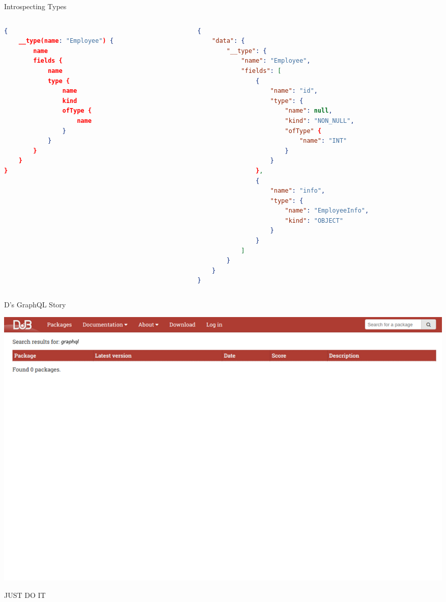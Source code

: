 \documentclass[aspectratio=169]{beamer}
\begin{document}
	\begin{frame}[fragile]{Introspecting Types}
		\vspace{-7mm}	
		\begin{columns}[t]
			\begin{column}{0.5\textwidth}
				\begin{lstlisting}[language=json,basicstyle=\scriptsize\ttfamily]
{
	__type(name: "Employee") {
		name
		fields {
			name
			type {
				name
				kind
				ofType {
					name
				}
			}
		}
	}
}
\end{lstlisting}	
			\end{column}
			\begin{column}{0.5\textwidth}
				\begin{lstlisting}[language=json,basicstyle=\scriptsize\ttfamily]
{
	"data": {
		"__type": {
			"name": "Employee",
			"fields": [
				{
					"name": "id",
					"type": {
						"name": null,
						"kind": "NON_NULL",
						"ofType" {
							"name": "INT"
						}
					}
				},
				{
					"name": "info",
					"type": {
						"name": "EmployeeInfo",
						"kind": "OBJECT"
					}
				}
			]
		}
	}
}
\end{lstlisting}	
			\end{column}
			
		\end{columns}
	\end{frame}

	\begin{frame}[fragile]{D's GraphQL Story}
		\begin{center}
			\includegraphics{graphqlsearch.jpg}	
		\end{center}	
	\end{frame}

	\begin{frame}{JUST DO IT}
		\begin{center}
		\end{center}
	\end{frame}
\end{document}
